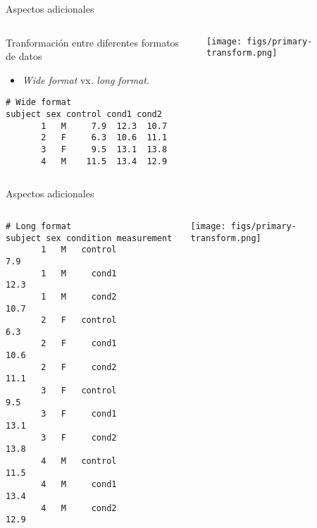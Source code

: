 \begin{frame}[fragile]{Aspectos adicionales}
 \begin{columns}[T]
    \begin{column}{.75\textwidth}
     \begin{wideitemize}
      \item Tranformación entre diferentes formatos de datos
      \begin{itemize}
       \item \textit{Wide format} vx. \textit{long format}.
      \end{itemize}

    \end{wideitemize}
    
    \begin{footnotesize}
    \begin{verbatim}
# Wide format
subject sex control cond1 cond2
       1   M     7.9  12.3  10.7
       2   F     6.3  10.6  11.1
       3   F     9.5  13.1  13.8
       4   M    11.5  13.4  12.9
    \end{verbatim}
    \end{footnotesize}
    
    \end{column}
    \begin{column}{.25\textwidth}
    \vspace*{1cm}
    \texttt{[image: figs/primary-transform.png]}
    \end{column}
  \end{columns}

\end{frame}


\begin{frame}[fragile]{Aspectos adicionales}
 \begin{columns}[T]
    \begin{column}{.75\textwidth}
        
    \begin{footnotesize}
    \begin{verbatim}
# Long format
subject sex condition measurement
       1   M   control         7.9
       1   M     cond1        12.3
       1   M     cond2        10.7
       2   F   control         6.3
       2   F     cond1        10.6
       2   F     cond2        11.1
       3   F   control         9.5
       3   F     cond1        13.1
       3   F     cond2        13.8
       4   M   control        11.5
       4   M     cond1        13.4
       4   M     cond2        12.9 
    \end{verbatim}
    \end{footnotesize}
    
    \end{column}
    \begin{column}{.25\textwidth}
    \vspace*{1cm}
    \texttt{[image: figs/primary-transform.png]}
    \end{column}
  \end{columns}

\end{frame}

